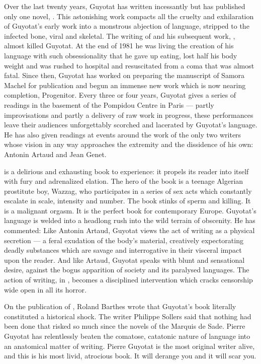 \documentclass[10pt,twoside]{memoir}
\begin{document}
Over the last twenty years, Guyotat has written incessantly but has published only one novel,
. This astonishing work compacts all the cruelty and exhilaration of Guyotat's
early work into a monstrous abjection of language, stripped to the infected bone, viral and
skeletal. The writing of  and his subsequent work, , almost killed Guyotat. At the end of 1981 he was living the creation of his language
with such obsessionality that he gave up eating, lost half his body weight and was rushed to
hospital and resuscitated from a coma that was almost fatal. Since then, Guyotat has worked on
preparing the manuscript of Samora Machel for publication and begun an immense new work which is now
nearing completion, Progenitor. Every three or four years, Guyotat gives a series of readings in the
basement of the Pompidou Centre in Paris --- partly improvisations and partly a delivery of raw work
in progress, these performances leave their audiences unforgettably scorched and lacerated by
Guyotat's language. He has also given readings at events around the work of the only two writers
whose vision in any way approaches the extremity and the dissidence of his own: Antonin Artaud and
Jean Genet.

 is a delirious and exhausting book to experience: it propels its reader
into itself with fury and adrenalized elation. The hero of the book is a teenage Algerian prostitute
boy, Wazzag, who participates in a series of sex acts which constantly escalate in scale, intensity
and number. The book stinks of sperm and killing. It is a malignant orgasm. It is the perfect book
for contemporary Europe. Guyotat's language is welded into a headlong rush into the wild terrain of
obscenity. He has commented:  Like Antonin Artaud, Guyotat views the act of writing as a
physical secretion --- a feral exudation of the body's material, creatively expectorating deadly
substances which are savage and interrogative in their visceral impact upon the reader. And like
Artaud, Guyotat speaks with blunt and sensational desire, against the bogus apparition of society
and its paralysed languages. The action of writing, in , becomes a
disciplined intervention which cracks censorship wide open in all its horror.

On the publication of , Roland Barthes wrote that Guyotat's book literally
constituted a historical shock. The writer Philippe Sollers said that nothing had been done that
risked so much since the novels of the Marquis de Sade. Pierre Guyotat has relentlessly beaten the
comatose, catatonic nature of language into an anatomical matter of writing. Pierre Guyotat is the
most original writer alive, and this is his most livid, atrocious book. It will derange you and it
will scar you.
\end{document}
